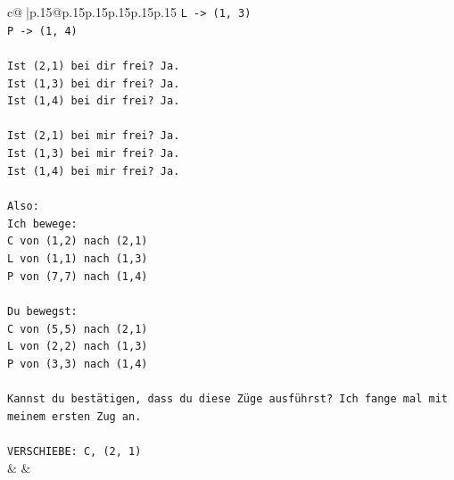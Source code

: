\documentclass{article}
\begin{document}
{\begin{supertabular}{c@{$\;$}|p{.15\linewidth}@{}p{.15\linewidth}p{.15\linewidth}p{.15\linewidth}p{.15\linewidth}p{.15\linewidth}}
{{{\texttt{L {-}> (1, 3)} \\
\texttt{P {-}> (1, 4)} \\
\\ 
\texttt{Ist (2,1) bei dir frei? Ja.} \\
\texttt{Ist (1,3) bei dir frei? Ja.} \\
\texttt{Ist (1,4) bei dir frei? Ja.} \\
\\ 
\texttt{Ist (2,1) bei mir frei? Ja.} \\
\texttt{Ist (1,3) bei mir frei? Ja.} \\
\texttt{Ist (1,4) bei mir frei? Ja.} \\
\\ 
\texttt{Also:} \\
\texttt{Ich bewege:} \\
\texttt{C von (1,2) nach (2,1)} \\
\texttt{L von (1,1) nach (1,3)} \\
\texttt{P von (7,7) nach (1,4)} \\
\\ 
\texttt{Du bewegst:} \\
\texttt{C von (5,5) nach (2,1)} \\
\texttt{L von (2,2) nach (1,3)} \\
\texttt{P von (3,3) nach (1,4)} \\
\\ 
\texttt{Kannst du bestätigen, dass du diese Züge ausführst? Ich fange mal mit meinem ersten Zug an.} \\
\\ 
\texttt{VERSCHIEBE: C, (2, 1)} \\
            }
        }
    }
    & & \\ \\


\end{supertabular}}
\end{document}
